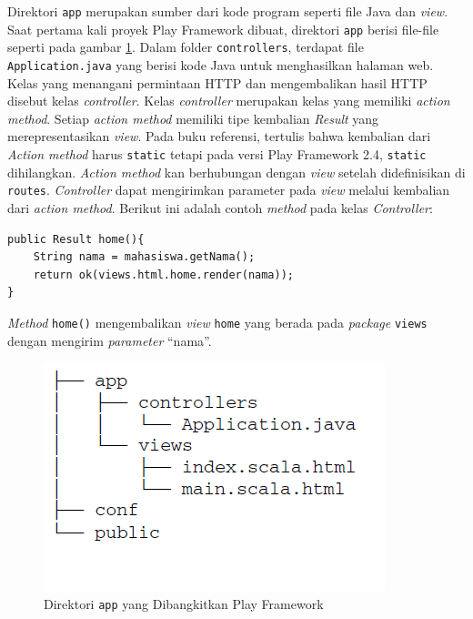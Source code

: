 Direktori \texttt{app} merupakan sumber dari kode program seperti file Java dan \textit{view}. Saat pertama kali proyek Play Framework dibuat, direktori \texttt{app} berisi file-file seperti pada gambar \ref{fig:2_app_dir}. Dalam folder \texttt{controllers}, terdapat file \texttt{Application.java} yang berisi kode Java untuk menghasilkan halaman web. Kelas yang menangani permintaan HTTP dan mengembalikan hasil HTTP disebut kelas \textit{controller}. Kelas \textit{controller} merupakan kelas yang memiliki \textit{action method}. Setiap \textit{action method} memiliki tipe kembalian \textit{Result} yang merepresentasikan \textit{view}. Pada buku referensi\cite{Leroux:2014}, tertulis bahwa kembalian dari \textit{Action method} harus \texttt{static} tetapi pada versi Play Framework 2.4, \texttt{static} dihilangkan. \textit{Action method} kan berhubungan dengan \textit{view} setelah didefinisikan di \texttt{routes}. \textit{Controller} dapat mengirimkan parameter pada \textit{view} melalui kembalian dari \textit{action method}. Berikut ini adalah contoh \textit{method} pada kelas \textit{Controller}:
\begin{lstlisting}
public Result home(){
	String nama = mahasiswa.getNama();
	return ok(views.html.home.render(nama));
}
\end{lstlisting}
\textit{Method} \texttt{home()} mengembalikan \textit{view} \texttt{home} yang berada pada \textit{package} \texttt{views} dengan mengirim \textit{parameter} ``nama''.

\begin{figure}[H]
	\centering
	\includegraphics[scale=0.5]{Gambar/app-dir}
	\caption{Direktori \texttt{app} yang Dibangkitkan Play Framework\cite{Leroux:2014}} 
	\label{fig:2_app_dir}
\end{figure}

